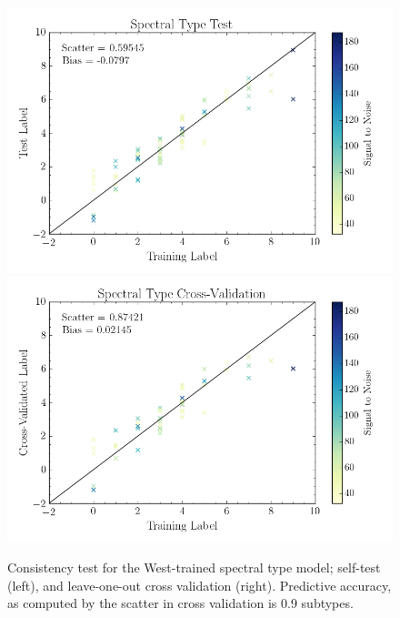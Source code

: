 \documentclass[twocolumn]{aastex62}
\begin{document}



\begin{figure}
	\begin{center}
	\includegraphics[width=\linewidth]{figures/self_test_spt.png}
	\includegraphics[width=\linewidth]{figures/crv_test_spt.png}
	\end{center}
	\caption{Consistency test for the West-trained spectral type model; self-test (left), and leave-one-out cross validation (right).  Predictive accuracy, as computed by the scatter in cross validation is 0.9 subtypes.}
	\label{fig:west_validation}
\end{figure}
\end{document}
